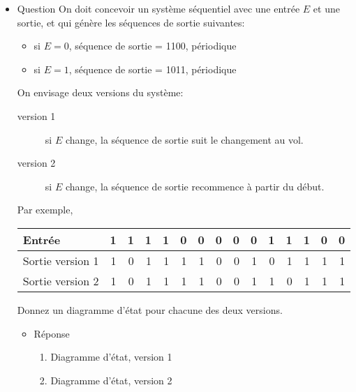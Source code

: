 \documentclass[letter, oneside]{book}
\begin{document}
\begin{itemize}
\item Question
\label{sec:org852f0c6}
On doit concevoir un système séquentiel avec une entrée \(E\) et une
sortie, et qui génère les séquences de sortie suivantes:

\begin{itemize}
\item si \(E=0\), séquence de sortie = 1100, périodique

\item si \(E=1\), séquence de sortie = 1011, périodique
\end{itemize}

On envisage deux versions du système:

\begin{description}
\item[{version 1}] si  \(E\) change, la séquence de sortie suit le
changement au vol.

\item[{version 2}] si \(E\) change, la séquence de sortie recommence à
partir du début.
\end{description}

Par exemple,
\begin{center}
\begin{tabular}{lrrrrrrrrrrrrrr}
Entrée & 1 & 1 & 1 & 1 & 0 & 0 & 0 & 0 & 0 & 1 & 1 & 1 & 0 & 0\\[0pt]
\hline
Sortie version 1 & 1 & 0 & 1 & 1 & 1 & 1 & 0 & 0 & 1 & 0 & 1 & 1 & 1 & 1\\[0pt]
Sortie version 2 & 1 & 0 & 1 & 1 & 1 & 1 & 0 & 0 & 1 & 1 & 0 & 1 & 1 & 1\\[0pt]
\end{tabular}
\end{center}

Donnez un diagramme d'état pour chacune des deux versions.

\begin{itemize}
\item Réponse
\label{sec:org799abc3}
\begin{enumerate}
\item Diagramme d'état, version 1

\begin{center}

\end{center}

\item Diagramme d'état, version 2

\begin{center}

\end{center}
\end{enumerate}
\end{itemize}


\end{itemize}
\end{document}
